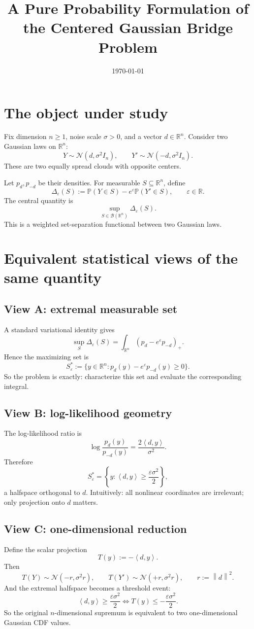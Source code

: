 \documentclass[11pt]{article}
\title{A Pure Probability Formulation of the Centered Gaussian Bridge Problem}
\author{}
\date{\today}
\newcommand{\R}{\mathbb{R}}
\newcommand{\Pbb}{\mathbb{P}}
\newcommand{\N}{\mathcal{N}}
\newcommand{\ip}[2]{\left\langle #1,#2\right\rangle}
\newcommand{\norm}[1]{\left\lVert #1\right\rVert}
\begin{document}
\maketitle

\section{The object under study}
Fix dimension $n\ge 1$, noise scale $\sigma>0$, and a vector $d\in\R^n$.
Consider two Gaussian laws on $\R^n$:
\[
Y\sim \N(d,\sigma^2 I_n),
\qquad
Y'\sim \N(-d,\sigma^2 I_n).
\]
These are two equally spread clouds with opposite centers.

Let $p_d,p_{-d}$ be their densities. For measurable $S\subseteq\R^n$, define
\[
\Delta_\varepsilon(S)
:=\Pbb(Y\in S)-e^{\varepsilon}\Pbb(Y'\in S),
\qquad \varepsilon\in\R.
\]
The central quantity is
\[
\sup_{S\in\mathcal B(\R^n)} \Delta_\varepsilon(S).
\]
This is a weighted set-separation functional between two Gaussian laws.

\section{Equivalent statistical views of the same quantity}

\subsection*{View A: extremal measurable set}
A standard variational identity gives
\[
\sup_S \Delta_\varepsilon(S)
=\int_{\R^n}(p_d-e^{\varepsilon}p_{-d})_+.
\]
Hence the maximizing set is
\[
S_\varepsilon^*:=\{y\in\R^n: p_d(y)-e^{\varepsilon}p_{-d}(y)\ge 0\}.
\]
So the problem is exactly: characterize this set and evaluate the corresponding integral.

\subsection*{View B: log-likelihood geometry}
The log-likelihood ratio is
\[
\log\frac{p_d(y)}{p_{-d}(y)}=\frac{2\ip{d}{y}}{\sigma^2}.
\]
Therefore
\[
S_\varepsilon^*
=\left\{y:\ip{d}{y}\ge \frac{\varepsilon\sigma^2}{2}\right\},
\]
a halfspace orthogonal to $d$. Intuitively: all nonlinear coordinates are irrelevant; only projection onto $d$ matters.

\subsection*{View C: one-dimensional reduction}
Define the scalar projection
\[
T(y):=-\ip{d}{y}.
\]
Then
\[
T(Y)\sim \N(-r,\sigma^2 r),
\qquad
T(Y')\sim \N(+r,\sigma^2 r),
\qquad
r:=\norm{d}^2.
\]
And the extremal halfspace becomes a threshold event:
\[
\ip{d}{y}\ge \frac{\varepsilon\sigma^2}{2}
\iff
T(y)\le -\frac{\varepsilon\sigma^2}{2}.
\]
So the original $n$-dimensional supremum is equivalent to two one-dimensional Gaussian CDF values.
\end{document}
